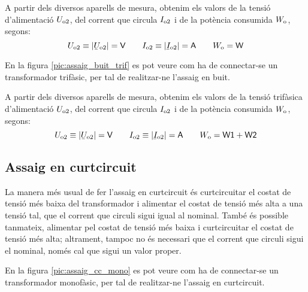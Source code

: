 A partir dels diversos aparells de mesura, obtenim els valors de la
tensió d'alimentació $U_\mathrm{o2}$, del corrent que circula
$I_\mathrm{o2}$ i de la potència consumida $W_\mathrm{o}$, segons:
\begin{equation}
    U\ped{o2}\equiv|\cmplx{U}\ped{o2}|=\textsf{V} \qquad
    I\ped{o2}\equiv|\cmplx{I}\ped{o2}|=\textsf{A}
    \qquad W\ped{o}=\textsf{W}
\end{equation}

En la figura \vref{pic:assaig_buit_trif} es pot veure com ha de
connectar-se un transformador trifàsic, per tal de realitzar-ne l'assaig en buit.

\begin{center}
    
    \label{pic:assaig_buit_trif}
\end{center}


A partir dels diversos aparells de mesura, obtenim els valors de la
tensió trifàsica d'alimentació $U_\mathrm{o2}$, del corrent que circula
$I_\mathrm{o2}$ i de la potència consumida $W_\mathrm{o}$, segons:
\begin{equation}
    U\ped{o2}\equiv|\cmplx{U}\ped{o2}|=\textsf{V} \qquad
    I\ped{o2}\equiv|\cmplx{I}\ped{o2}|=\textsf{A} \qquad
    W\ped{o}=\textsf{W1}+\textsf{W2}
\end{equation}

\subsection{Assaig en curtcircuit}

La manera més usual de fer l'assaig en curtcircuit és
curtcircuitar el costat de tensió més baixa del transformador i
alimentar el costat de tensió més alta a  una tensió tal, que el corrent
que circuli sigui igual al nominal. També és possible tanmateix,
alimentar pel costat de  tensió més baixa i curtcircuitar el costat de
 tensió més alta; altrament, tampoc no és necessari que el corrent
que circuli sigui el nominal, només cal que sigui un valor proper.

En la figura \vref{pic:assaig_cc_mono} es pot veure com ha de
connectar-se un transformador monofàsic, per tal de realitzar-ne l'assaig en curtcircuit.

\break
\begin{center}
    
    \label{pic:assaig_cc_mono} \
\end{center}

